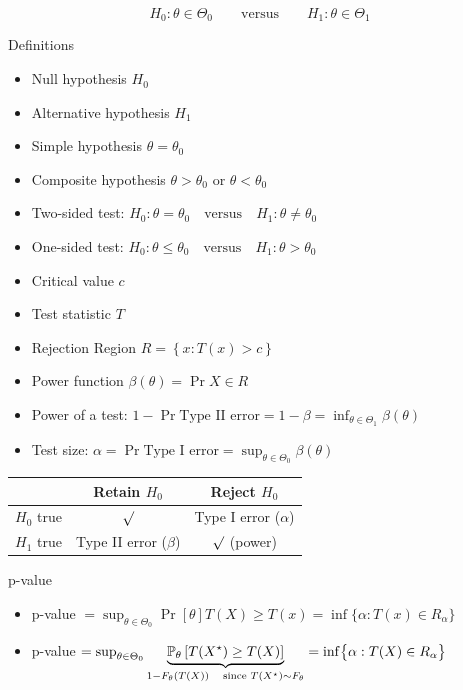 \documentclass[landscape]{article}
\begin{document}
\begin{multicols*}{2}
$$H_0: \theta\in\Theta_0 \qquad \text{versus} \qquad H_1: \theta\in\Theta_1$$

Definitions
\begin{itemize}
  \item Null hypothesis $H_0$
  \item Alternative hypothesis $H_1$
  \item Simple hypothesis $\theta = \theta_0$
  \item Composite hypothesis $\theta > \theta_0$ or $\theta < \theta_0$ 
  \item Two-sided test:
    $H_0: \theta=\theta_0 \quad\text{versus}\quad H_1: \theta\neq\theta_0$
  \item One-sided test:
    $H_0: \theta\le\theta_0 \quad\text{versus}\quad H_1: \theta>\theta_0$
  \item Critical value $c$
  \item Test statistic $T$
  \item Rejection Region $R = \left\{ x: T(x) > c \right\}$
  \item Power function $\beta(\theta) = \Pr{X \in R}$
  \item Power of a test: $1 - \Pr{\text{Type II error}} = 1-\beta 
    = \displaystyle\inf_{\theta \in \Theta_1} \beta(\theta)$
  \item Test size: $\alpha = \Pr{\text{Type I error}} 
    = \displaystyle\sup_{\theta\in\Theta_0}\beta(\theta)$
\end{itemize}

\centering
\begin{tabular}{l|cc}
  & \textsf{Retain} $H_0$ & \textsf{Reject} $H_0$ \\
  \hline
  $H_0$ \textsf{true} & $\surd$ & Type I error ($\alpha$)\\
  $H_1$ \textsf{true} & Type II error ($\beta$) & $\surd$ (power) \\
\end{tabular}

\raggedright
p-value
\begin{itemize}
  \item p-value $= \sup_{\theta\in\Theta_0} \Pr[\theta]{T(X) \ge T(x)}
                 = \inf\bigl\{ \alpha: T(x) \in R_\alpha \bigr\}$
  \item p-value $= \sup_{\theta\in\Theta_0} 
    \underbrace{\Pr[\theta]{T(X^\star) \ge T(X)}}_{1-F_\theta(T(X)) 
          \quad \text{since } T(X^\star) \dist F_\theta}
                 = \inf\bigl\{ \alpha: T(X) \in R_\alpha \bigr\}$
\end{itemize}


\end{multicols*}
\end{document}
